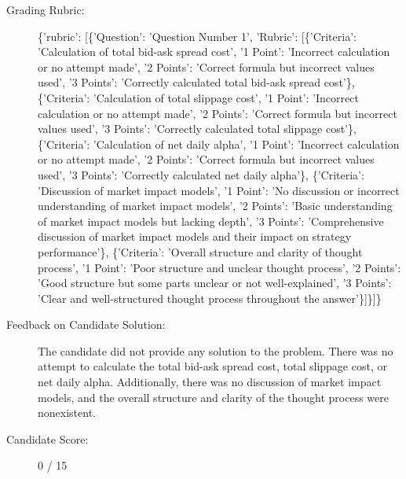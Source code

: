 \documentclass{article}%
\begin{document}
\begin{description}
\item[Grading Rubric: ]%
\{'rubric': {[}\{'Question': 'Question Number 1', 'Rubric': {[}\{'Criteria': 'Calculation of total bid{-}ask spread cost', '1 Point': 'Incorrect calculation or no attempt made', '2 Points': 'Correct formula but incorrect values used', '3 Points': 'Correctly calculated total bid{-}ask spread cost'\}, \{'Criteria': 'Calculation of total slippage cost', '1 Point': 'Incorrect calculation or no attempt made', '2 Points': 'Correct formula but incorrect values used', '3 Points': 'Correctly calculated total slippage cost'\}, \{'Criteria': 'Calculation of net daily alpha', '1 Point': 'Incorrect calculation or no attempt made', '2 Points': 'Correct formula but incorrect values used', '3 Points': 'Correctly calculated net daily alpha'\}, \{'Criteria': 'Discussion of market impact models', '1 Point': 'No discussion or incorrect understanding of market impact models', '2 Points': 'Basic understanding of market impact models but lacking depth', '3 Points': 'Comprehensive discussion of market impact models and their impact on strategy performance'\}, \{'Criteria': 'Overall structure and clarity of thought process', '1 Point': 'Poor structure and unclear thought process', '2 Points': 'Good structure but some parts unclear or not well{-}explained', '3 Points': 'Clear and well{-}structured thought process throughout the answer'\}{]}\}{]}\}%
\item[Feedback on Candidate Solution: ]%
The candidate did not provide any solution to the problem. There was no attempt to calculate the total bid{-}ask spread cost, total slippage cost, or net daily alpha. Additionally, there was no discussion of market impact models, and the overall structure and clarity of the thought process were nonexistent.%
\item[Candidate Score: ]%
0 / 15%
\end{description}

%
\end{document}
